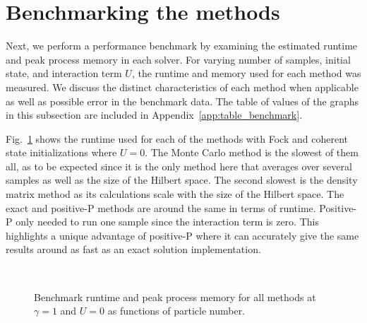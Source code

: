 \section{Benchmarking the methods}
\hspace{\parindent}Next, we perform a performance benchmark by examining the estimated runtime and peak process memory in each solver. For varying number of samples, initial state, and interaction term $U$, the runtime and memory used for each method was measured. We discuss the distinct characteristics of each method when applicable as well as possible error in the benchmark data. The table of values of the graphs in this subsection are included in Appendix~\ref{app:table_benchmark}.


\hspace{\parindent} Fig.~\ref{fig:benchmarkGamma1U0} shows the runtime used for each of the methods with Fock and coherent state initializations where $U=0$. The Monte Carlo method is the slowest of them all, as to be expected since it is the only method here that averages over several samples as well as the size of the Hilbert space. The second slowest is the density matrix method as its calculations scale with the size of the Hilbert space. The exact and positive-P methods are around the same in terms of runtime. Positive-P only needed to run one sample since the interaction term is zero. This highlights a unique advantage of positive-P where it can accurately give the same results around as fast as an exact solution implementation.

\begin{figure}[h]
  \centering
  \\
  \caption{
  Benchmark runtime and peak process memory for all methods at $\gamma=1$ and $U=0$ as functions of particle number. 
  }
  \label{fig:benchmarkGamma1U0}
\end{figure}

